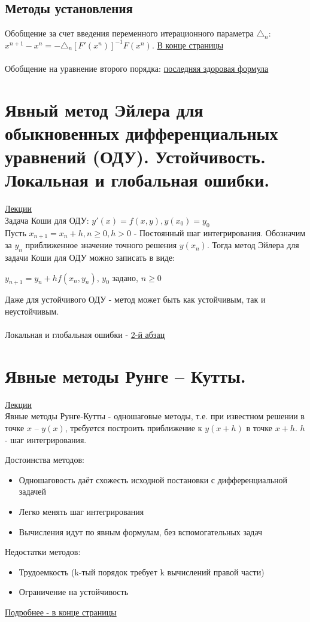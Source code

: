 \documentclass[specialist, subf, href, colorlinks=true, 12pt, times, mtpro, final]{disser}
\theoremstyle{definition}
\begin{document}
\subsection {Методы установления}

Обобщение за счет введения переменного итерационного параметра $\triangle_n$: $x^{n+1} - x^n= -\triangle_n [F'(x^n)]^{-1}F(x^n)$. \hyperlink {lects.85}{В конце страницы}
\\
\\
Обобщение на уравнение второго порядка: \hyperlink {lects.86}{последняя здоровая формула}

	

\section {Явный метод Эйлера для обыкновенных дифференциальных уравнений (ОДУ). Устойчивость. Локальная и глобальная ошибки.}
	\hyperlink {lects.87}{Лекции}\\
	Задача Коши для ОДУ: 
	$y'(x)=f(x,y), y(x_0) = y_0$\\
	
	Пусть $x_{n+1} = x_n + h, n \geq 0, h > 0$ - Постоянный шаг интегрирования. Обозначим за $y_n$ приближенное значение точного решения $y(x_n)$. Тогда метод Эйлера для задачи Коши для ОДУ можно записать в виде:\\
	\begin{center}
	$y_{n+1} = y_n + h f(x_n, y_n)$, $y_0$ задано, $n \geq 0$
	\end{center}

Даже для устойчивого ОДУ -  метод может быть как устойчивым, так и неустойчивым.\\
\\
Локальная и глобальная ошибки - \hyperlink {lects.88}{2-й абзац}


\section {Явные методы Рунге -- Кутты.}
	\hyperlink {lects.89}{Лекции}\\
	
	Явные методы Рунге-Кутты - одношаговые методы, т.е. при известном решении в точке $x$ \--- $y(x)$, требуется построить приближение к $y(x+h)$ в точке $x+h$. $h$ - шаг интегрирования.
	
	Достоинства методов:
	\begin{itemize}
	\item Одношаговость даёт схожесть исходной постановки с дифференциальной задачей
	\item Легко менять шаг интегрирования
	\item Вычисления идут по явным формулам, без вспомогательных задач
	\end{itemize}
	Недостатки методов:
	\begin{itemize}
	\item Трудоемкость (k-тый порядок требует k вычислений правой части)
	\item Ограничение на устойчивость 
	\end{itemize}
	\hyperlink {lects.90}{Подробнее - в конце страницы}\\
\end{document}
